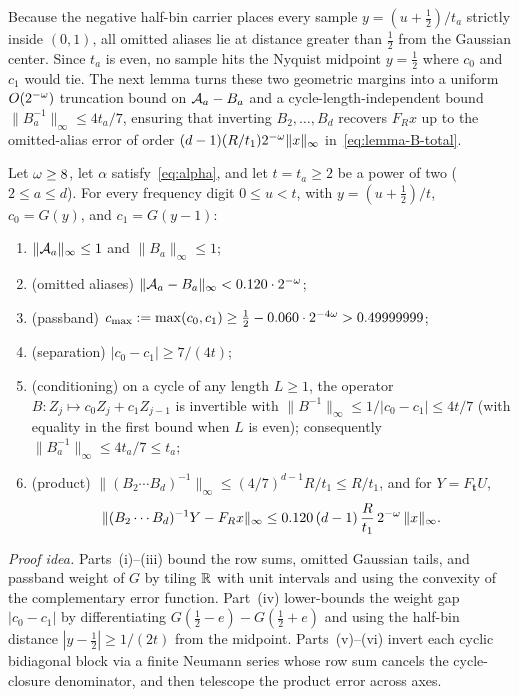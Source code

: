 Because the negative half-bin carrier places every sample $y=(u+\tfrac12)/t_a$ strictly inside $(0,1)$, all omitted
aliases lie at distance greater than $\tfrac12$ from the Gaussian center. Since $t_a$ is even, no sample hits the
Nyquist midpoint $y=\tfrac12$ where $c_0$ and $c_1$ would tie. The next lemma turns these two geometric margins into a
uniform $O(2^{-\omega})$ truncation bound on $\mathcal{A}_a-B_a$ and a cycle-length-independent bound
$\|B_a^{-1}\|_\infty\le 4t_a/7$, ensuring that inverting $B_2,\dots,B_d$ recovers $F_R x$ up to the omitted-alias error
of order $(d-1)(R/t_1)2^{-\omega}\|x\|_\infty$ in~\eqref{eq:lemma-B-total}.

\begin{lemma}\label{lem:bridge-B}
Let $\omega\ge 8$, let $\alpha$ satisfy~\eqref{eq:alpha}, and let $t=t_a\ge 2$ be a power of two ($2\le a\le d$). For every
frequency digit $0\le u<t$, with $y=(u+\tfrac12)/t$, $c_0=G(y)$, and $c_1=G(y-1)$:
\begin{enumerate}[label=(\roman*),leftmargin=*]
  \item $\|\mathcal{A}_a\|_\infty\le 1$ and $\|B_a\|_\infty\le 1$;
  \item \textup{(omitted aliases)} $\|\mathcal{A}_a-B_a\|_\infty<0.120\cdot 2^{-\omega}$;
  \item \textup{(passband)} $c_{\max}:=\max(c_0,c_1)\ge\tfrac12-0.060\cdot 2^{-4\omega}>0.49999999$;
  \item \textup{(separation)} $|c_0-c_1|\ge 7/(4t)$;
  \item \textup{(conditioning)} on a cycle of any length $L\ge 1$, the operator $B\colon Z_j\mapsto c_0 Z_j+c_1 Z_{j-1}$
    is invertible with $\|B^{-1}\|_\infty\le 1/|c_0-c_1|\le 4t/7$ (with equality in the first bound when $L$ is even);
    consequently $\|B_a^{-1}\|_\infty\le 4t_a/7\le t_a$;
  \item \textup{(product)} $\|(B_2\cdots B_d)^{-1}\|_\infty\le(4/7)^{d-1}R/t_1\le R/t_1$, and for $Y=F_{\mathbf t}U$,
    \begin{equation}\label{eq:lemma-B-total}
      \|(B_2\cdots B_d)^{-1}Y-F_R x\|_\infty\le 0.120\,(d-1)\,\frac{R}{t_1}\,2^{-\omega}\,\|x\|_\infty.
    \end{equation}
\end{enumerate}
\end{lemma}

\emph{Proof idea.} Parts~(i)--(iii) bound the row sums, omitted Gaussian tails, and passband weight of $G$ by tiling
$\mathbb{R}$ with unit intervals and using the convexity of the complementary error function. Part~(iv) lower-bounds the weight
gap $|c_0-c_1|$ by differentiating $G(\tfrac12-e)-G(\tfrac12+e)$ and using the half-bin distance $|y-\tfrac12|\ge 1/(2t)$
from the midpoint. Parts~(v)--(vi) invert each cyclic bidiagonal block via a finite Neumann series whose row sum cancels
the cycle-closure denominator, and then telescope the product error across axes.

